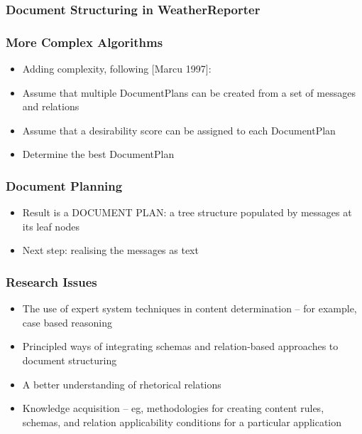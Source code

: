\documentclass[compress,color=usenames]{beamer}
\begin{document}
\begin{frame}
\frametitle{Document Structuring in WeatherReporter}

\label{f178}
 
\end{frame}

\begin{frame}
\frametitle{More Complex Algorithms}

\label{f180}
\begin{itemize}
\item { {Adding complexity, following \mbox{$[$}Marcu 1997\mbox{$]$}:}}
\item { {Assume that multiple DocumentPlans can be created from a set of messages and relations}}
\item { {Assume that a desirability score can be assigned to each DocumentPlan}}
\item { {Determine the best DocumentPlan}}
\end{itemize}
 
\end{frame}

\begin{frame}
\frametitle{Document Planning}

\label{f182}
\begin{itemize}
\item { {Result is a DOCUMENT PLAN: a tree structure populated by messages at its leaf nodes}}
\item { {Next step: realising the messages as text}}
\end{itemize}
 
\end{frame}

\begin{frame}
\frametitle{Research Issues}

\label{f184}
\begin{itemize}
\item { {The use of expert system techniques in content determination -- for example, case based reasoning}}
\item { {Principled ways of integrating schemas and relation-based approaches to document structuring}}
\item { {A better understanding of rhetorical relations}}
\item { {Knowledge acquisition -- eg, methodologies for creating content rules, schemas, and relation applicability conditions for a particular application}}
\end{itemize}
 
\end{frame}
\end{document}
